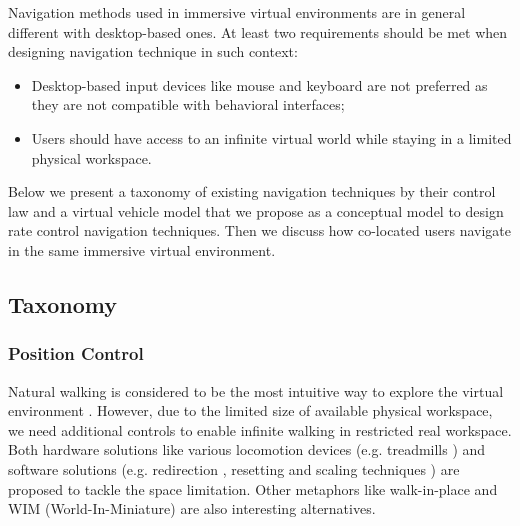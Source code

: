 Navigation methods used in immersive virtual environments are in general different with desktop-based ones. At least two requirements should be met when designing navigation technique in such context:

\begin{itemize}
\item Desktop-based input devices like mouse and keyboard are not preferred as they are not compatible with behavioral interfaces;
\item Users should have access to an infinite virtual world while staying in a limited physical workspace.
\end{itemize}

Below we present a taxonomy of existing navigation techniques by their control law and a virtual vehicle model that we propose as a conceptual model to design rate control navigation techniques. Then we discuss how co-located users navigate in the same immersive virtual environment.

\subsection{Taxonomy}
\subsubsection{Position Control}
Natural walking is considered to be the most intuitive way to explore the virtual environment \citep{Ruddle2009BW}. However, due to the limited size of available physical workspace, we need additional controls to enable infinite walking in restricted real workspace. Both hardware solutions like various locomotion devices (e.g. treadmills \citep{Iwata1999Treadmill}) and software solutions (e.g. redirection \citep{Peck2008RED}, resetting \citep{Williams2007ELV} and scaling techniques \citep{Interrante2007SLB}) are proposed to tackle the space limitation. Other metaphors like walk-in-place \citep{Razzaque2002RWP} and WIM (World-In-Miniature) \citep{Stoakley1995VRW} are also interesting alternatives.

